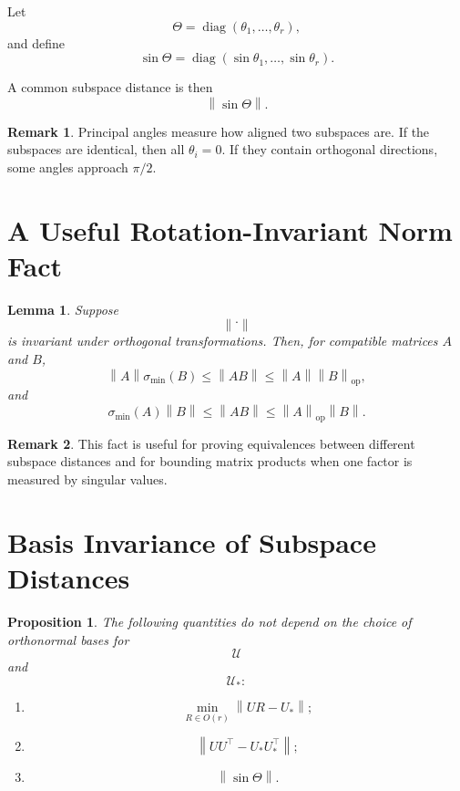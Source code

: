 \documentclass[12pt,oneside]{book}
\numberwithin{equation}{section}
\theoremstyle{definition}
\newtheorem{remark}{Remark}[section]
\theoremstyle{plain}
\newtheorem{lemma}{Lemma}[section]
\newtheorem{proposition}{Proposition}[section]
\theoremstyle{remark}
\newcommand{\norm}[1]{\left\lVert #1 \right\rVert}
\newcommand{\diag}{\operatorname{diag}}
\begin{document}
Let
\[
\Theta
=
\diag(\theta_1,\dots,\theta_r),
\]
and define
\[
\sin\Theta
=
\diag(\sin\theta_1,\dots,\sin\theta_r).
\]

A common subspace distance is then
\[
\norm{\sin\Theta}.
\]

\begin{remark}
Principal angles measure how aligned two subspaces are. If the subspaces are identical, then all $\theta_i=0$. If they contain orthogonal directions, some angles approach $\pi/2$.
\end{remark}

\section{A Useful Rotation-Invariant Norm Fact}

\begin{lemma}
Suppose
\[
\norm{\cdot}
\]
is invariant under orthogonal transformations. Then, for compatible matrices $A$ and $B$,
\[
\norm{A}\sigma_{\min}(B)
\leq
\norm{AB}
\leq
\norm{A}\norm{B}_{\mathrm{op}},
\]
and
\[
\sigma_{\min}(A)\norm{B}
\leq
\norm{AB}
\leq
\norm{A}_{\mathrm{op}}\norm{B}.
\]
\end{lemma}

\begin{remark}
This fact is useful for proving equivalences between different subspace distances and for bounding matrix products when one factor is measured by singular values.
\end{remark}

\section{Basis Invariance of Subspace Distances}

\begin{proposition}
The following quantities do not depend on the choice of orthonormal bases for
\[
\mathcal{U}
\]
and
\[
\mathcal{U}_*:
\]
\begin{enumerate}
\item
\[
\min_{R\in O(r)}
\norm{UR-U_*};
\]

\item
\[
\norm{UU^\top-U_*U_*^\top};
\]

\item
\[
\norm{\sin\Theta}.
\]
\end{enumerate}
\end{proposition}
\end{document}
